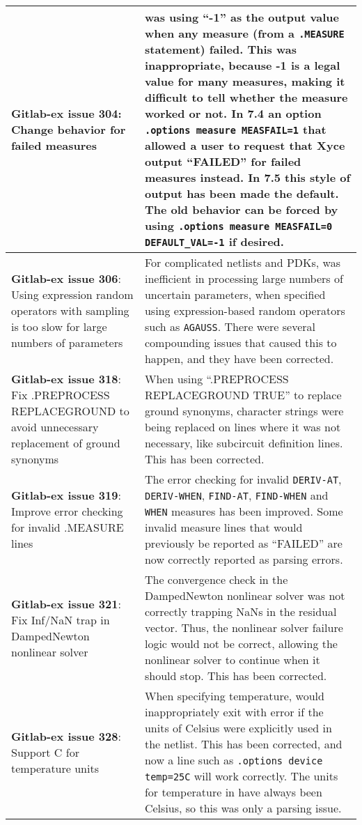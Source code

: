 {\begin{longtable}[h] {>{\raggedright\small}m{2in}|>{\raggedright\let\\\tabularnewline\small}m{3.5in}}
\textbf{Gitlab-ex issue 304}: Change \Xyce{} behavior for failed measures &
\Xyce{} was using ``-1'' as the output value when any measure (from a
\texttt{.MEASURE} statement) failed.  This was inappropriate, because -1 is a
legal value for many measures, making it difficult to tell whether the
measure worked or not.  In \Xyce{} 7.4 an option \texttt{.options
measure MEASFAIL=1} that allowed a user to request that Xyce output
``FAILED'' for failed measures instead.  In \Xyce{} 7.5 this style of
output has been made the default.  The old behavior can be forced by
using \texttt{.options measure MEASFAIL=0 DEFAULT\_VAL=-1} if
desired. \\ \hline

\textbf{Gitlab-ex issue 306}:  Using expression random operators with sampling is too slow for large numbers of parameters &
For complicated netlists and PDKs, \Xyce{} was inefficient in
processing large numbers of uncertain parameters, when specified using
expression-based random operators such as \texttt{AGAUSS}.  There were
several compounding issues that caused this to happen, and they have
been corrected.  \\ \hline

\textbf{Gitlab-ex issue 318}:  Fix .PREPROCESS REPLACEGROUND to avoid
unnecessary replacement of ground synonyms & When using ``.PREPROCESS
REPLACEGROUND TRUE'' to replace ground synonyms, character strings
were being replaced on lines where it was not necessary, like
subcircuit definition lines.  This has been corrected. \\ \hline

\textbf{Gitlab-ex issue 319}:  Improve error checking for invalid
.MEASURE lines & The error checking for invalid \texttt{DERIV-AT},
\texttt{DERIV-WHEN}, \texttt{FIND-AT}, \texttt{FIND-WHEN} and
\texttt{WHEN} measures has been improved.  Some invalid measure
lines that would previously be reported as ``FAILED'' are now
correctly reported as parsing errors. \\ \hline

\textbf{Gitlab-ex issue 321}:  Fix Inf/NaN trap in DampedNewton nonlinear solver &
The convergence check in the DampedNewton nonlinear solver was not
correctly trapping NaNs in the residual vector.  Thus, the nonlinear
solver failure logic would not be correct, allowing the nonlinear
solver to continue when it should stop.  This has been
corrected. \\ \hline

\textbf{Gitlab-ex issue 328}:  Support C for temperature units &
  When specifying temperature, \Xyce{} would inappropriately exit with
  error if the units of Celsius were explicitly used in the netlist.
  This has been corrected, and now a line such as \texttt{.options
  device temp=25C} will work correctly.  The units for temperature
  in \Xyce{} have always been Celsius, so this was only a parsing
  issue. \\ \hline


\end{longtable}}
